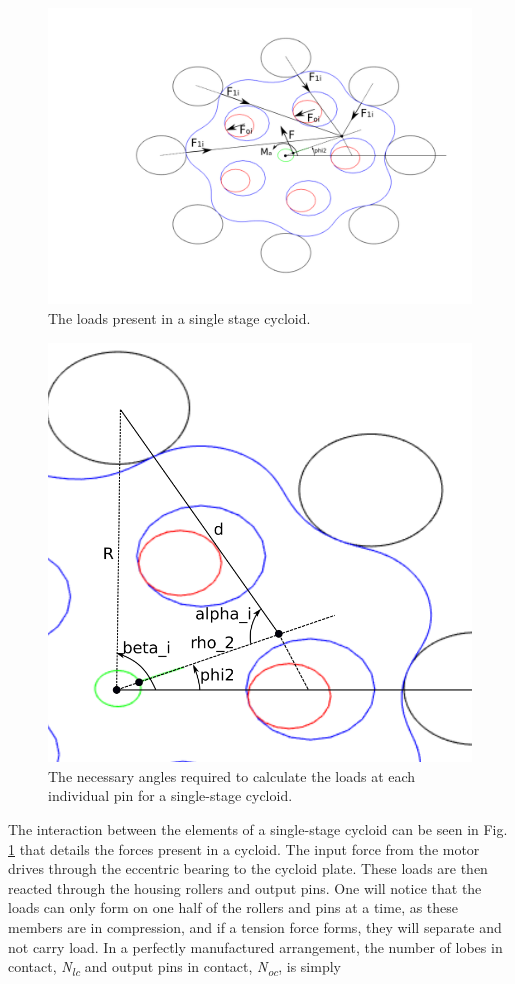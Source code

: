 \begin{figure}[h]
   \centering
   \includegraphics[width=01.0\linewidth]{fig/single_loads}
   \caption{The loads present in a single stage cycloid.}
   \label{fig:single_loads}
\end{figure}

\begin{figure}[h]
   \centering
   \includegraphics[width=0.6\linewidth]{fig/single_loads_angles}
   \caption{The necessary angles required to calculate the loads at each individual pin for a single-stage cycloid.}
   \label{fig:single_loads_angles}
\end{figure}


The interaction between the elements of a single-stage cycloid can be seen in Fig. \ref{fig:single_loads} that details the forces present in a cycloid. The input force from the motor drives through the eccentric bearing to the cycloid plate. These loads are then reacted through the housing rollers and output pins. One will notice that the loads can only form on one half of the rollers and pins at a time, as these members are in compression, and if a tension force forms, they will separate and not carry load. In a perfectly manufactured arrangement, the number of lobes in contact, \textit{N\textsubscript{lc}} and output pins in contact, \textit{N\textsubscript{oc}}, is simply 

